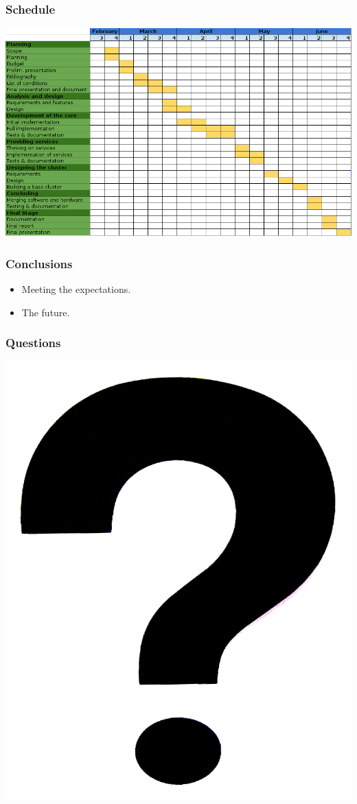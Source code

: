 \documentclass[12pt]{beamer}
\begin{document}
\begin{frame}
\vfill
  \frametitle{Schedule}
  \begin{center}
    \includegraphics[scale=0.45]{images/gantt.png}
  \end{center}
\vfill
\end{frame}

\begin{frame}
\vfill
  \frametitle{Conclusions}
  \begin{itemize}
    \item Meeting the expectations.
    \vfill
    \item The future.
    \vfill
  \end{itemize}
\vfill
\end{frame}

\begin{frame}
\vfill
  \frametitle{Questions}
  \begin{center}
    \vfill
    \includegraphics[scale=0.15]{images/questions.png}
    \vfill
  \end{center}
\vfill
\end{frame}
\end{document}
